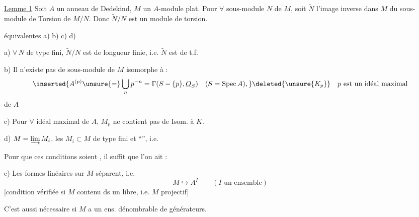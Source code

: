 \deleted{\[f(gh)=\sum f_i(g)\varphi_i(h),\]}

\uline{Lemme 1} Soit $A$ un anneau de Dedekind, $M$ un $A$-module plat.  Pour $\forall$ sous-module $N$ de $M$, soit $\tilde N$ l'image inverse dans $M$ du sous-module de Torsion de $M/N$. Donc $\tilde N/N$ est un module de torsion.

 équivalentes a) b) c) d)

a) $\forall\,N$ de type fini, $\tilde N/N$ est de longueur finie, i.e. $\tilde N$ est de t.f.

\margin{$\unsure{\Uparrow|\Updownarrow}$}
b)  Il n'existe pas de sous-module de $M$ isomorphe à :
\[
\inserted{A^{(p)}\unsure{=}\bigcup_n p^{-n}=\Gamma(S-\{p\},\underline O_S)\quad(S=\operatorname{Spec}A),}
\deleted{\unsure{K_p}}\quad p\text{ est un idéal maximal}
\]
de $A$ 

\margin{$\Updownarrow$}
c)  Pour $\forall$ idéal maximal  de $A$, $M_p$ ne contient pas de  Isom. à $K$.

d) $M=\varinjlim M_i$, les $M_i\subset M$ de type fini et ``'', i.e. 

Pour que ces conditions soient , il suffit que l'on ait :

e) Les formes linéaires sur $M$ séparent, i.e.
\[
M\hookrightarrow A^I\qquad(I\text{ un ensemble})
\]
[condition vérifiée si $M$ contenu ds un libre,  i.e. $M$ projectif]

C'est aussi nécessaire si $M$ a un ens. dénombrable de générateurs.
